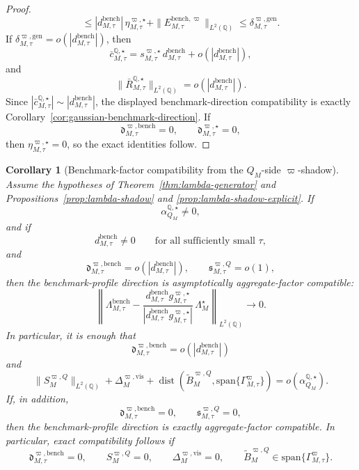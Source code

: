 \documentclass[11pt,a4paper]{amsart}
\theoremstyle{plain}
\newtheorem{corollary}[theorem]{Corollary}
\theoremstyle{definition}
\theoremstyle{remark}
\DeclareMathOperator{\dist}{dist}
\newcommand{\QQ}{\mathbb{Q}}
\begin{document}
\begin{proof}
\[        \le
        |d_{M,\tau}^{\mathrm{bench}}|\,\eta_{M,\tau}^{\varpi,\star}
        +
        \|E_{M,\tau}^{\mathrm{bench},\varpi}\|_{L^2(\QQ)}
        \le
        \delta_{M,\tau}^{\varpi,\mathrm{gen}}.
\]
If \(\delta_{M,\tau}^{\varpi,\mathrm{gen}}=o(|d_{M,\tau}^{\mathrm{bench}}|)\), then
\[
        \bar c_{M,\tau}^{\QQ,\star}
        =
        s_{M,\tau}^{\varpi,\star}\,d_{M,\tau}^{\mathrm{bench}}
        +
        o\!\left(|d_{M,\tau}^{\mathrm{bench}}|\right),
\]
and
\[
        \|\bar R_{M,\tau}^{\QQ,\star}\|_{L^2(\QQ)}
        =
        o\!\left(|d_{M,\tau}^{\mathrm{bench}}|\right).
\]
Since \(|\bar c_{M,\tau}^{\QQ,\star}|\sim |d_{M,\tau}^{\mathrm{bench}}|\), the displayed
benchmark-direction compatibility is exactly Corollary~\ref{cor:gaussian-benchmark-direction}.  If
\[
        \mathfrak d_{M,\tau}^{\varpi,\mathrm{bench}}=0,
        \qquad
        \mathfrak d_{M,\tau}^{\varpi,\star}=0,
\]
then \(\eta_{M,\tau}^{\varpi,\star}=0\), so the exact identities follow.
\end{proof}

\begin{corollary}[Benchmark-factor compatibility from the \(Q_M\)-side \(\varpi\)-shadow]\label{cor:lambda-shadow}
Assume the hypotheses of Theorem~\ref{thm:lambda-generator} and
Propositions~\ref{prop:lambda-shadow} and \ref{prop:lambda-shadow-explicit}.  If
\[
        \alpha_{Q_M}^{\QQ,\star}\neq0,
\]
and if
\[
        d_{M,\tau}^{\mathrm{bench}}\neq0
        \qquad
        \text{for all sufficiently small }\tau,
\]
and
\[
        \mathfrak d_{M,\tau}^{\varpi,\mathrm{bench}}
        =
        o\!\left(|d_{M,\tau}^{\mathrm{bench}}|\right),
        \qquad
        \mathfrak s_{M,\tau}^{\varpi,Q}=o(1),
\]
then the benchmark-profile direction is asymptotically aggregate-factor compatible:
\[
        \left\|
                \Lambda_{M,\tau}^{\mathrm{bench}}
                -
                \frac{d_{M,\tau}^{\mathrm{bench}}g_{M,\tau}^{\varpi,\star}}
                {|d_{M,\tau}^{\mathrm{bench}}g_{M,\tau}^{\varpi,\star}|}\,
                \Lambda_M^\star
        \right\|_{L^2(\QQ)}
        \to0.
\]
In particular, it is enough that
\[
        \mathfrak d_{M,\tau}^{\varpi,\mathrm{bench}}
        =
        o\!\left(|d_{M,\tau}^{\mathrm{bench}}|\right)
\]
and
\[
        \|S_{M}^{\varpi,Q}\|_{L^2(\QQ)}
        +
        \Delta_{M}^{\varpi,\mathrm{vis}}
        +
        \dist\!\left(
                \widetilde B_{M}^{\varpi,Q},
                \mathrm{span}\{\Gamma_{M,\tau}^\varpi\}
        \right)
        =
        o\!\left(\alpha_{Q_M}^{\QQ,\star}\right).
\]
If, in addition,
\[
        \mathfrak d_{M,\tau}^{\varpi,\mathrm{bench}}=0,
        \qquad
        \mathfrak s_{M,\tau}^{\varpi,Q}=0,
\]
then the benchmark-profile direction is exactly aggregate-factor compatible.
In particular, exact compatibility follows if
\[
        \mathfrak d_{M,\tau}^{\varpi,\mathrm{bench}}=0,
        \qquad
        S_{M}^{\varpi,Q}=0,
        \qquad
        \Delta_{M}^{\varpi,\mathrm{vis}}=0,
        \qquad
        \widetilde B_{M}^{\varpi,Q}\in \mathrm{span}\{\Gamma_{M,\tau}^\varpi\}.
\]
\end{corollary}
\end{document}
